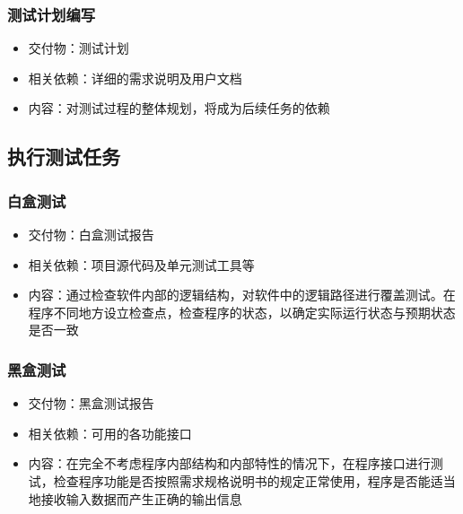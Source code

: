 \documentclass[hyperref, a4paper]{ctexart}
\providecommand{\tightlist}{%
  \setlength{\itemsep}{0pt}\setlength{\parskip}{0pt}}
\begin{document}
\hypertarget{ux6d4bux8bd5ux8ba1ux5212ux7f16ux5199}{%
\subsubsection{测试计划编写}\label{ux6d4bux8bd5ux8ba1ux5212ux7f16ux5199}}

\begin{itemize}
\tightlist
\item
  交付物：测试计划
\item
  相关依赖：详细的需求说明及用户文档
\item
  内容：对测试过程的整体规划，将成为后续任务的依赖
\end{itemize}

\hypertarget{ux6267ux884cux6d4bux8bd5ux4efbux52a1}{%
\subsection{执行测试任务}\label{ux6267ux884cux6d4bux8bd5ux4efbux52a1}}

\hypertarget{ux767dux76d2ux6d4bux8bd5}{%
\subsubsection{白盒测试}\label{ux767dux76d2ux6d4bux8bd5}}

\begin{itemize}
\tightlist
\item
  交付物：白盒测试报告
\item
  相关依赖：项目源代码及单元测试工具等
\item
  内容：通过检查软件内部的逻辑结构，对软件中的逻辑路径进行覆盖测试。在程序不同地方设立检查点，检查程序的状态，以确定实际运行状态与预期状态是否一致
\end{itemize}

\hypertarget{ux9ed1ux76d2ux6d4bux8bd5}{%
\subsubsection{黑盒测试}\label{ux9ed1ux76d2ux6d4bux8bd5}}

\begin{itemize}
\tightlist
\item
  交付物：黑盒测试报告
\item
  相关依赖：可用的各功能接口
\item
  内容：在完全不考虑程序内部结构和内部特性的情况下，在程序接口进行测试，检查程序功能是否按照需求规格说明书的规定正常使用，程序是否能适当地接收输入数据而产生正确的输出信息
\end{itemize}
\end{document}
